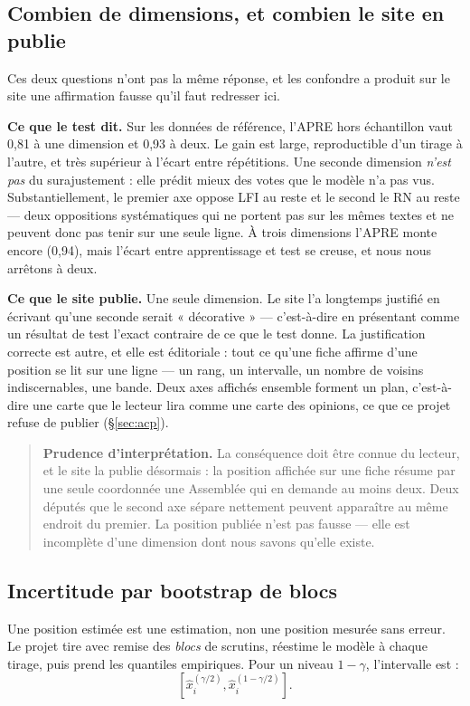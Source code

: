 \documentclass[11pt,a4paper]{article}
\newcommand{\prudence}[1]{\begin{quote}\small\color{red!55!black}\textbf{Prudence d'interprétation.} #1\end{quote}}
\begin{document}
\subsection{Combien de dimensions, et combien le site en publie}
\label{sec:dimensions}

Ces deux questions n'ont pas la même réponse, et les confondre a produit sur le
site une affirmation fausse qu'il faut redresser ici.

\textbf{Ce que le test dit.} Sur les données de référence, l'APRE hors
échantillon vaut 0,81 à une dimension et 0,93 à deux. Le gain est large,
reproductible d'un tirage à l'autre, et très supérieur à l'écart entre
répétitions. Une seconde dimension \emph{n'est pas} du surajustement : elle
prédit mieux des votes que le modèle n'a pas vus. Substantiellement, le premier
axe oppose LFI au reste et le second le RN au reste — deux oppositions
systématiques qui ne portent pas sur les mêmes textes et ne peuvent donc pas
tenir sur une seule ligne. À trois dimensions l'APRE monte encore (0,94), mais
l'écart entre apprentissage et test se creuse, et nous nous arrêtons à deux.

\textbf{Ce que le site publie.} Une seule dimension. Le site l'a longtemps
justifié en écrivant qu'une seconde serait « décorative » — c'est-à-dire en
présentant comme un résultat de test l'exact contraire de ce que le test donne.
La justification correcte est autre, et elle est éditoriale : tout ce qu'une
fiche affirme d'une position se lit sur une ligne — un rang, un intervalle, un
nombre de voisins indiscernables, une bande. Deux axes affichés ensemble
forment un plan, c'est-à-dire une carte que le lecteur lira comme une carte des
opinions, ce que ce projet refuse de publier (§\ref{sec:acp}).

\prudence{La conséquence doit être connue du lecteur, et le site la publie
désormais : la position affichée sur une fiche résume par une seule coordonnée
une Assemblée qui en demande au moins deux. Deux députés que le second axe
sépare nettement peuvent apparaître au même endroit du premier. La position
publiée n'est pas fausse — elle est incomplète d'une dimension dont nous savons
qu'elle existe.}

\subsection{Incertitude par bootstrap de blocs}

\label{sec:bootstrap}
Une position estimée est une estimation, non une position mesurée sans erreur.
Le projet tire avec remise des \emph{blocs} de scrutins, réestime le modèle à
chaque tirage, puis prend les quantiles empiriques. Pour un niveau $1-\gamma$,
l'intervalle est :
\[
 [\widehat x_i^{(\gamma/2)},\widehat x_i^{(1-\gamma/2)}].
\]
\end{document}
